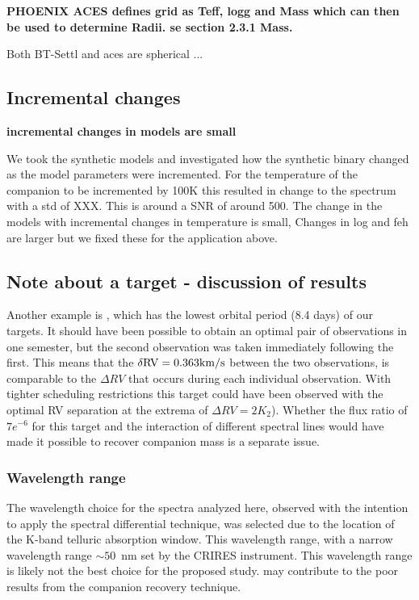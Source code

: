 \textbf{
    PHOENIX ACES defines grid as Teff, logg and Mass which can then be used to determine Radii. se \citep{husser_new_2013} section 2.3.1 Mass.}

Both BT-Settl and aces are spherical
...




\subsection{Incremental changes}
\textbf{incremental changes in models are small}

We took the synthetic models and investigated how the synthetic binary changed as the model parameters were incremented.  For the temperature of the companion to be incremented by 100K this resulted in change to the spectrum with a std of XXX. This is around a SNR of around 500.
The change in the models with incremental changes in temperature is small, Changes in log and feh are larger but we fixed these for the application above.





\subsection{Note about a target - discussion of results}
Another example is , which has the lowest orbital period (8.4 days) of our targets. It should have been possible to obtain an optimal pair of observations in one semester, but the second observation was taken immediately following the first. This means that the \(\rm \delta RV = 0.363 km/s \) between the two observations, is comparable to the \(\Delta RV \) that occurs during each individual observation. With tighter scheduling restrictions this target could have been observed with the optimal RV separation at the  extrema of \(\Delta RV=2 K_{2}\)). Whether the flux ratio of \(7e^{-6}\) for this target and the interaction of different spectral lines would have made it possible to recover companion mass is a separate issue.



\subsubsection {Wavelength range}
The wavelength choice for the spectra analyzed here, observed with the intention to apply the spectral differential technique, was selected due to the location of the K-band telluric absorption window. This wavelength range, with a narrow wavelength range \(\sim50\)~nm set by the CRIRES instrument. This wavelength range is likely not the best choice for the proposed study. may contribute to the poor results from the companion recovery technique. 

